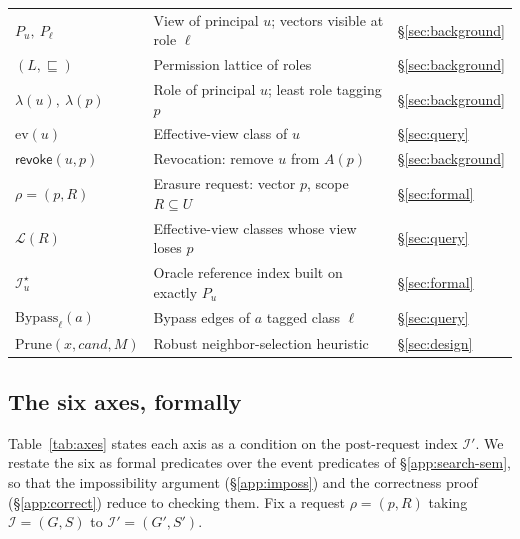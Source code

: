 \documentclass[sigconf, nonacm, review]{acmart}
\newcommand{\rev}{\mathsf{revoke}}
\begin{document}
\begin{table}[t]
\begin{tabular}{@{}l l l@{}}
$P_u,\ P_\ell$ & View of principal $u$; vectors visible at role $\ell$ & \S\ref{sec:background} \\
$(L,\sqsubseteq)$ & Permission lattice of roles & \S\ref{sec:background} \\
$\lambda(u),\ \lambda(p)$ & Role of principal $u$; least role tagging $p$ & \S\ref{sec:background} \\
$\mathrm{ev}(u)$ & Effective-view class of $u$ & \S\ref{sec:query} \\
$\rev(u,p)$ & Revocation: remove $u$ from $A(p)$ & \S\ref{sec:background} \\
$\rho=(p,R)$ & Erasure request: vector $p$, scope $R\subseteq U$ & \S\ref{sec:formal} \\
$\mathcal{L}(R)$ & Effective-view classes whose view loses $p$ & \S\ref{sec:query} \\
$\mathcal{I}^\star_u$ & Oracle reference index built on exactly $P_u$ & \S\ref{sec:formal} \\
$\mathrm{Bypass}_\ell(a)$ & Bypass edges of $a$ tagged class $\ell$ & \S\ref{sec:query} \\
$\mathrm{Prune}(x,\mathit{cand},M)$ & Robust neighbor-selection heuristic & \S\ref{sec:design} \\
\bottomrule
\end{tabular}
\end{table}

\subsection{The six axes, formally}
\label{app:axes}

Table~\ref{tab:axes} states each axis as a condition on the post-request index
$\mathcal{I}'$. We restate the six as formal predicates over the event
predicates of \S\ref{app:search-sem}, so that the impossibility argument
(\S\ref{app:imposs}) and the correctness proof (\S\ref{app:correct}) reduce to
checking them. Fix a request $\rho=(p,R)$ taking $\mathcal{I}=(G,S)$ to
$\mathcal{I}'=(G',S')$.
\end{document}
